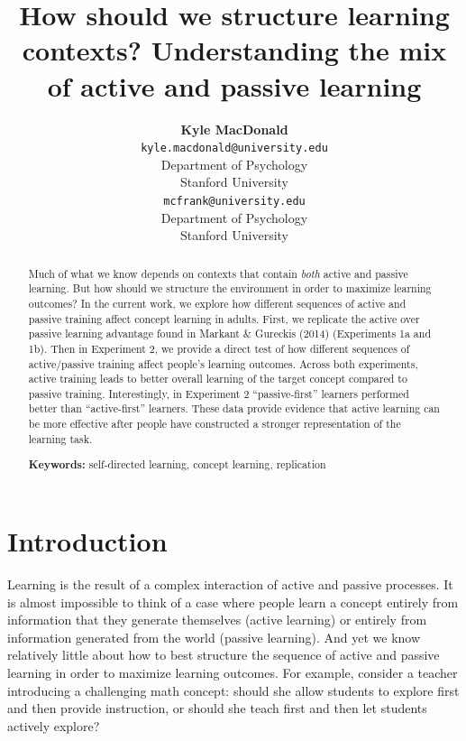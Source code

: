 \documentclass[10pt, letterpaper]{article}
\title{How should we structure learning contexts? Understanding the mix of
active and passive learning}
\author{{\large \bf Kyle MacDonald} \\ \texttt{kyle.macdonald@university.edu} \\ Department of Psychology \\ Stanford University \And {\large \bf Michael C. Frank} \\ \texttt{mcfrank@university.edu} \\ Department of Psychology \\ Stanford University}
\begin{document}
\maketitle

\begin{abstract}
Much of what we know depends on contexts that contain \emph{both} active
and passive learning. But how should we structure the environment in
order to maximize learning outcomes? In the current work, we explore how
different sequences of active and passive training affect concept
learning in adults. First, we replicate the active over passive learning
advantage found in Markant \& Gureckis (2014) (Experiments 1a and 1b).
Then in Experiment 2, we provide a direct test of how different
sequences of active/passive training affect people's learning outcomes.
Across both experiments, active training leads to better overall
learning of the target concept compared to passive training.
Interestingly, in Experiment 2 ``passive-first'' learners performed
better than ``active-first'' learners. These data provide evidence that
active learning can be more effective after people have constructed a
stronger representation of the learning task.

\textbf{Keywords:}
self-directed learning, concept learning, replication
\end{abstract}

\section{Introduction}\label{introduction}

Learning is the result of a complex interaction of active and passive
processes. It is almost impossible to think of a case where people learn
a concept entirely from information that they generate themselves
(active learning) or entirely from information generated from the world
(passive learning). And yet we know relatively little about how to best
structure the sequence of active and passive learning in order to
maximize learning outcomes. For example, consider a teacher introducing
a challenging math concept: should she allow students to explore first
and then provide instruction, or should she teach first and then let
students actively explore?
\end{document}
